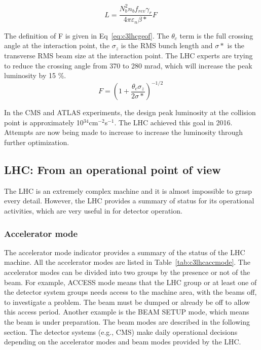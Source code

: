 \begin{equation}
 L = \frac{N^{2}_{b}n_{b}f_{rev}\gamma_{r}}{4\pi \varepsilon_{n}\beta *}F \;
 \label{eq:c3lhclumi}
\end{equation}

The definition of F is given in Eq~\ref{eq:c3lhcgeof}. The $\theta_{c}$ term is the full crossing angle at the interaction point, the $\sigma_{z}$ is the RMS bunch length and $\sigma *$ is the transverse RMS beam size at the interaction point. The LHC experts are trying to reduce the crossing angle from 370 to 280 mrad, which will increase the peak luminosity by 15 \%. 
\begin{equation}
 F = (1+\frac{\theta_{c}\sigma_{z}}{2\sigma *})^{-1/2} \;
 \label{eq:c3lhcgeof}
\end{equation}

In the CMS and ATLAS experiments, the design peak luminosity at the collision point is approximately 10$^{34}$cm$^{-2}$s$^{-1}$. The LHC achieved this goal in 2016. Attempts are now being made to increase to increase the luminosity through further optimization.

\subsection{LHC: From an operational point of view}

The LHC is an extremely complex machine and it is almost impossible to grasp every detail. However, the LHC provides a summary of status for its operational activities, which are very useful in for detector operation.

\subsubsection{Accelerator mode}

The accelerator mode indicator provides a summary of the status of the LHC machine. All the accelerator modes are listed in Table~\ref{tab:c3lhcaccmode}. The accelerator modes can be divided into two groups by the presence or not of the beam. For example, ACCESS mode means that the LHC group or at least one of the detector system groups needs access to the machine area, with the beams off, to investigate a problem. The beam must be dumped or already be off to allow this access period. Another example is the BEAM SETUP mode, which means the beam is under preparation. The beam modes are described in the following section. The detector systems (e.g., CMS) make daily operational decisions depending on the accelerator modes and beam modes provided by the LHC.


